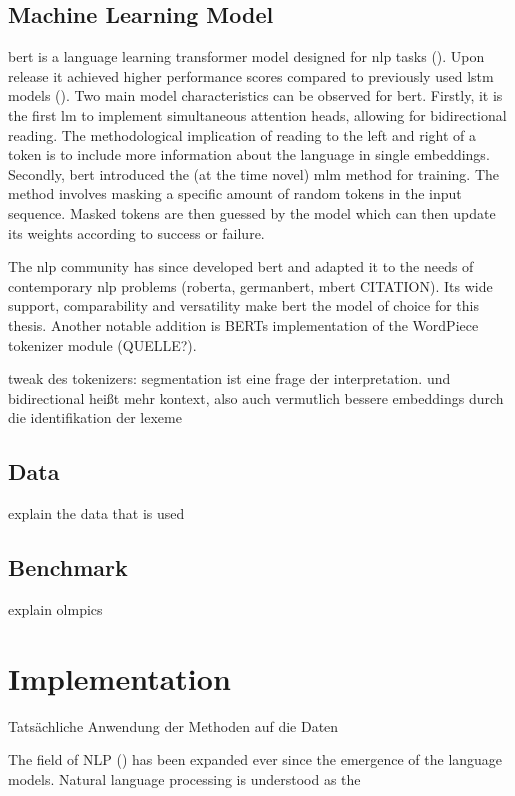 \documentclass[english]{ttlab-qualify}
\begin{document}
    \subsection{Machine Learning Model}
    \ac{bert} is a language learning transformer model designed for \ac{nlp} tasks (\cite{ATTENTION}).
    Upon release it achieved higher performance scores compared to previously used \ac{lstm} models (\cite{LSTM}).
    Two main model characteristics can be observed for \ac{bert}.
    Firstly, it is the first \ac{lm} to implement simultaneous attention heads, allowing for bidirectional reading.
    The methodological implication of reading to the left and right of a token is to include more information about the language in single embeddings.
    Secondly, \ac{bert} introduced the (at the time novel) \ac{mlm} method for training.
    The method involves masking a specific amount of random tokens in the input sequence.
    Masked tokens are then guessed by the model which can then update its weights according to success or failure.

    The \ac{nlp} community has since developed \ac{bert} and adapted it to the needs of contemporary \ac{nlp} problems (roberta, germanbert, mbert \uppercase{citation}).
    Its wide support, comparability and versatility make \ac{bert} the model of choice for this thesis.
    Another notable addition is \uppercase{bert}s implementation of the WordPiece tokenizer module (\uppercase{quelle?}).



    tweak des tokenizers: segmentation ist eine frage der interpretation.
    und bidirectional heißt mehr kontext, also auch vermutlich bessere embeddings durch die identifikation der lexeme
    \subsection{Data}
    explain the data that is used
    \subsection{Benchmark}
    explain olmpics

    \section{Implementation}
    Tatsächliche Anwendung der Methoden auf die Daten

    



    The field of NLP  (\cite{METZLER2016}) has been expanded ever since the emergence of the language models.
    Natural language processing is understood as the
    \\
\end{document}
